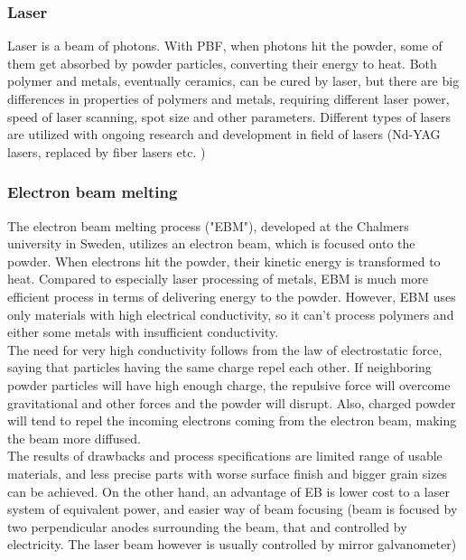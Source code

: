 \documentclass[a4paper, twoside, 11pt]{report}
\begin{document}
\subsubsection{Laser}
Laser is a beam of photons. With PBF, when photons hit the powder, some of them get absorbed by powder particles, converting their energy to heat. Both polymer and metals, eventually ceramics, can be cured by laser, but there are big differences in properties of polymers and metals, requiring different laser power, speed of laser scanning, spot size and other parameters. Different types of lasers are utilized with ongoing research and development in field of lasers (Nd-YAG lasers, replaced by fiber lasers etc. \cite[p. 252]{AMT})

\subsubsection{Electron beam melting}
The electron beam melting process ("EBM"), developed at the Chalmers university in Sweden, utilizes an electron beam, which is focused onto the powder. When electrons hit the powder, their kinetic energy is transformed to heat. Compared to especially laser processing of metals, EBM is much more efficient process in terms of delivering energy to the powder. However, EBM uses only materials with high electrical conductivity, so it can't process polymers and either some metals with insufficient conductivity.\\
	The need for very high conductivity follows from the law of electrostatic force, saying that particles having the same charge repel each other. If neighboring powder particles will have high enough charge, the repulsive force will overcome gravitational and other forces and the powder will disrupt. Also, charged powder will tend to repel the incoming electrons coming from the electron beam, making the beam more diffused.\\
	The results of drawbacks and process specifications are limited range of usable materials, and less precise parts with worse surface finish and bigger grain sizes can be achieved. On the other hand, an advantage of EB is lower cost to a laser system of equivalent power, and easier way of beam focusing (beam is focused by two perpendicular anodes surrounding the beam, that and controlled by electricity. The laser beam however is usually controlled by mirror galvanometer)
\end{document}
